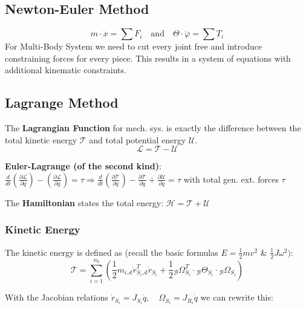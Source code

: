 \documentclass[fontsize=6pt,DIV=calc,a4paper,ngerman]{scrartcl}
\begin{document}
\begin{multicols*}{4}
\begin{center}
	\end{center}

	\subsection{Newton-Euler Method}

	$$m\cdot \ddot{x} = \sum F_i \quad \text{and} \quad \Theta \cdot \ddot{\varphi} = \sum T_i$$
	For Multi-Body System we need to cut every joint free and introduce constraining forces for every piece. This results in a system of equations with additional kinematic constraints.

	\subsection{Lagrange Method}

	The \textbf{Lagrangian Function} for mech. sys. is exactly the difference between the total kinetic energy $\mathcal{T}$ and total potential energy $\mathcal{U}$.
	$$\mathcal{L} = \mathcal{T}-\mathcal{U}$$

	\textbf{Euler-Lagrange (of the second kind)}:
	$
		\frac{d}{dt}\left(\frac{\partial \mathcal{L}}{\partial \dot{q}}\right) - \left(\frac{\partial \mathcal{L}}{\partial q}\right) = \tau
		\Rightarrow
		\frac{d}{dt} \left(\frac{\partial \mathcal{T}}{\partial \dot{q}} \right) - \frac{\partial \mathcal{T}}{\partial q} + \frac{\partial \mathcal{U}}{\partial q} = \tau
	$
	with total gen. ext. forces $\tau$

	The \textbf{Hamiltonian} states the total energy: $\mathcal{H}= \mathcal{T}+\mathcal{U}$

	\subsubsection{Kinetic Energy}

	The kinetic energy is defined as (recall the basic formulas $E = \frac{1}{2}mv^2$ \& $\frac{1}{2}J\omega^2)$:
	$$\mathcal{T} = \sum_{i=1}^{n_b}\left( \frac{1}{2} m_i{}_\mathcal{A}\dot{r}^{T}_{S_i}{}_\mathcal{A}\dot{r}_{S_i}+\frac{1}{2}{}_\mathcal{B}\Omega_{S_i}^T \cdot {}_\mathcal{B}\Theta_{S_i}\cdot {}_\mathcal{B}\Omega_{S_i}\right)$$

	With the Jacobian relations $\dot{r}_{S_i} = J_{S_i}\dot{q}, \quad \Omega_{S_i} = J_{R_i}\dot{q} $ we can rewrite this:


\end{multicols*}
\end{document}
